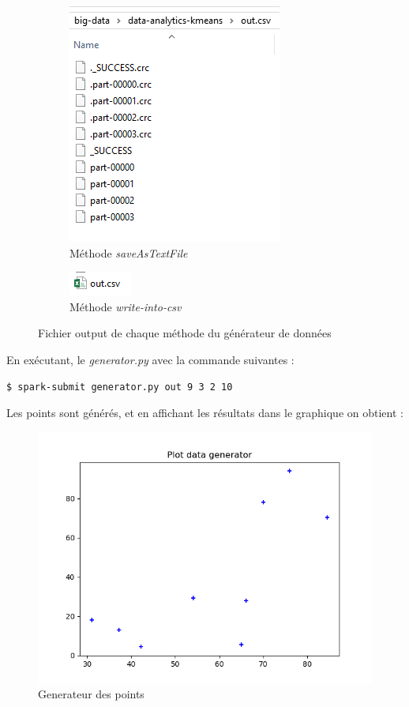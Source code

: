 \documentclass[french]{article}
\begin{document}
\begin{figure}[h!]
\centering
\begin{subfigure}{.5\textwidth}
  \centering
  \includegraphics[width=.4\linewidth]{img/save-text-file.png}
  \caption{Méthode \textit{saveAsTextFile}}
  \label{fig:sub1}
\end{subfigure}%
\begin{subfigure}{.5\textwidth}
  \centering
  \includegraphics[width=.4\linewidth]{img/write-into-csv.png}
  \caption{Méthode \textit{write-into-csv}}
  \label{fig:sub2}
\end{subfigure}
\caption{Fichier output de chaque méthode du générateur de données}
\label{fig:test}
\end{figure}

\newpage
\noindent En exécutant, le \textit{generator.py} avec la commande suivantes : 
\begin{lstlisting}[language=bash]
  $ spark-submit generator.py out 9 3 2 10
\end{lstlisting}
Les points sont générés, et en affichant les résultats dans le graphique on obtient :
\begin{figure}[h!]
  \centering
  \includegraphics[width=\linewidth]{img/generator-points.png}
  \caption{Generateur des points}
\end{figure}
\end{document}
